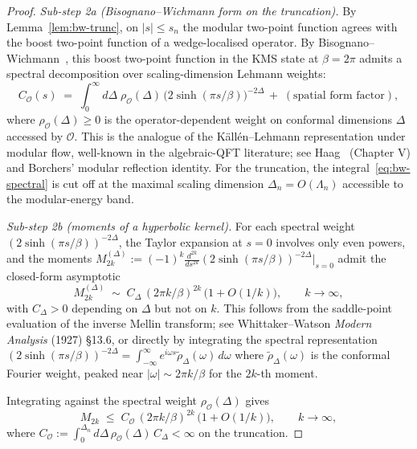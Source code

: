 \documentclass[12pt,a4paper]{article}
\begin{document}
\begin{proof}
\emph{Sub-step 2a (Bisognano--Wichmann form on the truncation).}
By Lemma~\ref{lem:bw-trunc}, on $|s|\le s_n$ the modular two-point
function agrees with the boost two-point function of a wedge-localised
operator. By Bisognano--Wichmann~\cite{BisognanoWichmann1976}, this
boost two-point function in the KMS state at $\beta = 2\pi$ admits a
spectral decomposition over scaling-dimension Lehmann weights:
\begin{equation}
  C_\mathcal{O}(s)
  \;=\;
  \int_0^\infty \!d\Delta\;\rho_\mathcal{O}(\Delta)
  \,\bigl(2\sinh(\pi s/\beta)\bigr)^{-2\Delta}\,
  + \;(\text{spatial form factor}),
  \label{eq:bw-spectral}
\end{equation}
where $\rho_\mathcal{O}(\Delta) \ge 0$ is the operator-dependent
weight on conformal dimensions $\Delta$ accessed by $\mathcal{O}$.
This is the analogue of the K\"all\'en--Lehmann representation under
modular flow, well-known in the algebraic-QFT literature; see
Haag~\cite{Haag1996} (Chapter V) and Borchers' modular reflection
identity. For the truncation, the integral~\eqref{eq:bw-spectral} is
cut off at the maximal scaling dimension $\Delta_n = O(\Lambda_n)$
accessible to the modular-energy band.

\emph{Sub-step 2b (moments of a hyperbolic kernel).}
For each spectral weight $(2\sinh(\pi s/\beta))^{-2\Delta}$, the
Taylor expansion at $s=0$ involves only even powers, and the
moments $M_{2k}^{(\Delta)} := (-1)^k \frac{d^{2k}}{ds^{2k}}
(2\sinh(\pi s/\beta))^{-2\Delta}|_{s=0}$ admit the closed-form
asymptotic
\begin{equation}
  M_{2k}^{(\Delta)}
  \;\sim\;
  C_\Delta \,(2\pi k/\beta)^{2k}
  \,\bigl(1 + O(1/k)\bigr),
  \qquad k\to\infty,
  \label{eq:moment-asymp}
\end{equation}
with $C_\Delta > 0$ depending on $\Delta$ but not on $k$.
This follows from the saddle-point evaluation of the inverse Mellin
transform; see Whittaker--Watson \emph{Modern Analysis} (1927)
\S 13.6, or directly by integrating the spectral representation
$(2\sinh(\pi s/\beta))^{-2\Delta} = \int_{-\infty}^\infty
e^{i\omega s} \tilde\rho_\Delta(\omega)\,d\omega$ where
$\tilde\rho_\Delta(\omega)$ is the conformal Fourier weight,
peaked near $|\omega| \sim 2\pi k/\beta$ for the $2k$-th moment.

Integrating against the spectral weight $\rho_\mathcal{O}(\Delta)$
gives
\begin{equation}
  M_{2k} \;\le\; C_\mathcal{O}\,(2\pi k/\beta)^{2k}
  \,\bigl(1 + O(1/k)\bigr),
  \qquad k\to\infty,
  \label{eq:total-moment}
\end{equation}
where $C_\mathcal{O} := \int_0^{\Delta_n}d\Delta\,\rho_\mathcal{O}(\Delta)
\,C_\Delta < \infty$ on the truncation.


\end{proof}
\end{document}
